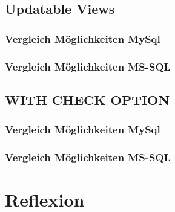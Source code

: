 \documentclass[11pt,a4paper,parskip=half]{scrartcl}
\begin{document}
\subsection{Updatable Views}
\subsubsection{Vergleich Möglichkeiten MySql}
\subsubsection{Vergleich Möglichkeiten MS-SQL}

\subsection{WITH CHECK OPTION}
\subsubsection{Vergleich Möglichkeiten MySql}
\subsubsection{Vergleich Möglichkeiten MS-SQL}

\section{Reflexion}
\end{document}
